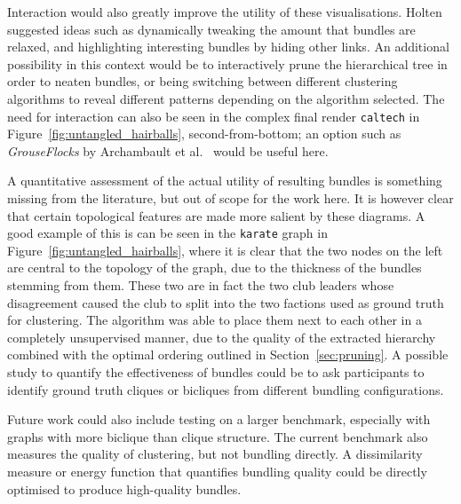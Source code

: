 Interaction would also greatly improve the utility of these visualisations. Holten \cite{Holten2006} suggested ideas such as dynamically tweaking the amount that bundles are relaxed, and highlighting interesting bundles by hiding other links. An additional possibility in this context would be to interactively prune the hierarchical tree in order to neaten bundles, or being switching between different clustering algorithms to reveal different patterns depending on the algorithm selected.
The need for interaction can also be seen in the complex final render \texttt{caltech} in Figure~\ref{fig:untangled_hairballs}, second-from-bottom; an option such as \emph{GrouseFlocks} by Archambault et al.\ \cite{Archambault2008} would be useful here.

A quantitative assessment of the actual utility of resulting bundles is something missing from the literature, but out of scope for the work here.
It is however clear that certain topological features are made more salient by these diagrams. A good example of this is can be seen in the \texttt{karate} graph in Figure~\ref{fig:untangled_hairballs}, where it is clear that the two nodes on the left are central to the topology of the graph, due to the thickness of the bundles stemming from them. These two are in fact the two club leaders whose disagreement caused the club to split into the two factions used as ground truth for clustering. The algorithm was able to place them next to each other in a completely unsupervised manner, due to the quality of the extracted hierarchy combined with the optimal ordering \cite{Bar-Joseph2001} outlined in Section~\ref{sec:pruning}.
A possible study to quantify the effectiveness of bundles could be to ask participants to identify ground truth cliques or bicliques from different bundling configurations.

Future work could also include testing on a larger benchmark, especially with graphs with more biclique than clique structure.
The current benchmark also measures the quality of clustering, but not bundling directly. A dissimilarity measure or energy function that quantifies bundling quality could be directly optimised to produce high-quality bundles.


